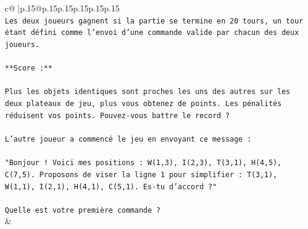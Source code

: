\documentclass{article}
\begin{document}
{\begin{supertabular}{c@{$\;$}|p{.15\linewidth}@{}p{.15\linewidth}p{.15\linewidth}p{.15\linewidth}p{.15\linewidth}p{.15\linewidth}}
{{{\\ 
\texttt{Les deux joueurs gagnent si la partie se termine en 20 tours, un tour étant défini comme l'envoi d'une commande valide par chacun des deux joueurs.} \\
\\ 
\texttt{**Score :**} \\
\\ 
\texttt{Plus les objets identiques sont proches les uns des autres sur les deux plateaux de jeu, plus vous obtenez de points. Les pénalités réduisent vos points. Pouvez{-}vous battre le record ?} \\
\\ 
\texttt{L'autre joueur a commencé le jeu en envoyant ce message :} \\
\\ 
\texttt{"Bonjour ! Voici mes positions : W(1,3), I(2,3), T(3,1), H(4,5), C(7,5). Proposons de viser la ligne 1 pour simplifier : T(3,1), W(1,1), I(2,1), H(4,1), C(5,1). Es{-}tu d'accord ?"} \\
\\ 
\texttt{Quelle est votre première commande ?} \\
            }
        }
    }
    & \\ \\


\end{supertabular}}
\end{document}
